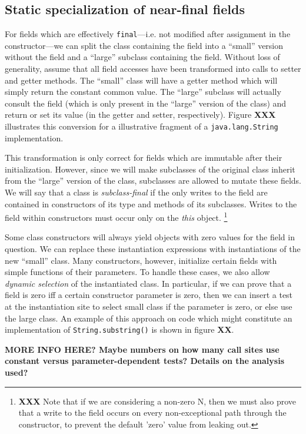\documentclass[preprint]{acmconf}
\begin{document}
\subsection{Static specialization of near-final fields}
For fields which are effectively {\tt final}---i.e. not modified after
assignment in the constructor---we can split the class containing the
field into a ``small'' version without the field and a ``large''
subclass containing the field.  Without loss of generality, assume
that all field accesses have been transformed into calls to setter and
getter methods.  The ``small'' class will have a getter method
which will simply return the constant common value.  The ``large''
subclass will actually consult the field (which is only present in the
``large'' version of the class) and return or set its value (in the
getter and setter, respectively).  Figure {\bf XXX} illustrates this
conversion for a illustrative fragment of a {\tt java.lang.String}
implementation.

This transformation is only correct for fields which are immutable
after their initialization.  However, since we will make subclasses of the
original class inherit from the ``large'' version of the class,
subclasses are allowed to mutate these fields.  We will say that
a class is {\it subclass-final} if the only writes to the field
are contained in constructors of its type and methods of its
subclasses.  Writes to the field within constructors must occur only on
the {\it this} object.%
\footnote{{\bf XXX} Note that if we are considering a non-zero N, then
  we must also prove that a write to the field occurs on every
  non-exceptional path through the constructor, to prevent the default
  'zero' value from leaking out.}

Some class constructors will always yield objects with zero values for
the field in question.  We can replace these instantiation expressions
with instantiations of the new ``small'' class.  Many constructors,
however, initialize certain fields with simple functions of their
parameters.  To handle these cases, we also allow {\it dynamic
  selection} of the instantiated class.  In particular, if we can
prove that a field is zero iff a certain constructor parameter is
zero, then we can insert a test at the instantiation site to select
small class if the parameter is zero, or else use the large class.
An example of this approach on code which might constitute an
implementation of {\tt String.substring()} is shown in figure {\bf XX}.

{\bf MORE INFO HERE? Maybe numbers on how many call sites use constant
  versus parameter-dependent tests?  Details on the analysis used?}
\end{document}
